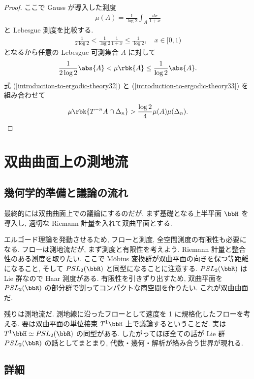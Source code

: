 \documentclass[openany, a4paper, oneside]{jsbook}
\begin{document}
\begin{proof}
ここで Gauss が導入した測度
\begin{align}
 \mu (A)
 =
 \frac{1}{\log 2} \int_A \frac{dx}{1+x}
\end{align}
と Lebesgue 測度を比較する.
\begin{align}
 \frac{1}{2 \log 2}
 <
 \frac{1}{\log 2} \frac{1}{1 + x}
 \leq
 \frac{1}{\log2}, \quad x \in [0, 1)
\end{align}
となるから任意の Lebesgue 可測集合 $A$ に対して
\begin{align}
 \frac{1}{2 \log 2} \abs{A}
 <
 \mu \rbk{A}
 \leq
 \frac{1}{\log 2} \abs{A}. \label{introduction-to-ergodic-theory33}
\end{align}
式 (\ref{introduction-to-ergodic-theory32}) と (\ref{introduction-to-ergodic-theory33}) を組み合わせて
\begin{align}
 \mu \rbk{T^{-n} A \cap \Delta_n}
 >
 \frac{\log 2}{4} \mu (A) \mu (\Delta_n).
\end{align}
\end{proof}
\section{双曲曲面上の測地流\label{introduction-to-ergodic-theory16}}

\subsection{幾何学的準備と議論の流れ}

最終的には双曲曲面上での議論にするのだが, まず基礎となる上半平面 $\bbH$ を導入し,
適切な Riemann 計量を入れて双曲平面とする.

エルゴード理論を発動させるため, フローと測度, 全空間測度の有限性も必要になる.
フローは測地流だが, まず測度と有限性を考えよう.
Riemann 計量と整合性のある測度を取りたい.
ここで M\"obius 変換群が双曲平面の向きを保つ等距離になること,
そして $PSL_2(\bbR)$ と同型になることに注意する.
$PSL_2(\bbR)$ は Lie 群なので Haar 測度がある.
有限性を引きずり出すため, 双曲平面を $PSL_2 (\bbR)$ の部分群で割ってコンパクトな商空間を作りたい.
これが双曲曲面だ.

残りは測地流だ.
測地線に沿ったフローとして速度を 1 に規格化したフローを考える.
要は双曲平面の単位接束 $T^1 \bbH$ 上で議論するということだ.
実は $T^1 \bbH \simeq PSL_2(\bbR)$ の同型がある.
したがってほぼ全ての話が Lie 群 $PSL_2 (\bbR)$ の話としてまとまり,
代数・幾何・解析が絡み合う世界が現れる.
\subsection{詳細}
\end{document}
